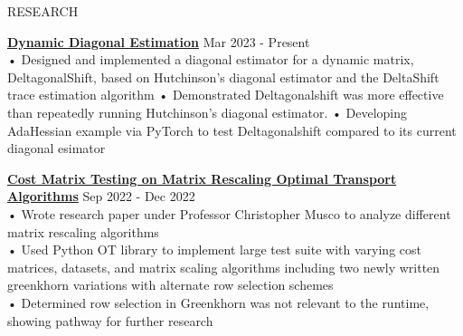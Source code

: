 \documentclass{resume} %
\begin{document}
\begin{rSection}{RESEARCH}

\textbf {\href{https://github.com/aminoa/deltagonalshift}{Dynamic Diagonal Estimation}} \hfill Mar 2023 - Present \\
• Designed and implemented a diagonal estimator for a dynamic matrix, DeltagonalShift, based on Hutchinson's diagonal estimator and the DeltaShift trace estimation algorithm \newline
• Demonstrated Deltagonalshift was more effective than repeatedly running Hutchinson's diagonal estimator. \newline
• Developing AdaHessian example via PyTorch to test Deltagonalshift compared to its current diagonal esimator

\textbf {\href{https://github.com/aminoa/gaussian_pot_tests}{Cost Matrix Testing on Matrix Rescaling Optimal Transport Algorithms}} \hfill Sep 2022 - Dec 2022 \\
• Wrote research paper under Professor Christopher Musco to analyze different matrix rescaling algorithms\\ 
• Used Python OT library to implement large test suite with varying cost matrices, datasets, and matrix scaling algorithms including two newly written greenkhorn variations with alternate row selection schemes \\ 
• Determined row selection in Greenkhorn was not relevant to the runtime, showing pathway for further research

\end{rSection}
\end{document}

